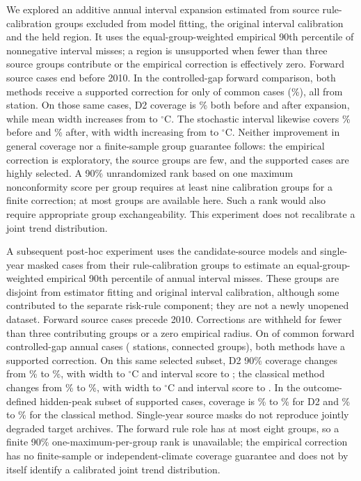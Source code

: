 \documentclass[draft,linenumbers]{agujournal2025}
\begin{document}
We explored an additive annual interval expansion estimated from source rule-calibration groups excluded from model fitting, the original interval calibration and the held region. It uses the equal-group-weighted empirical 90th percentile of nonnegative interval misses; a region is unsupported when fewer than three source groups contribute or the empirical correction is effectively zero. Forward source cases end before 2010. In the controlled-gap forward comparison, both methods receive a supported correction for only \AEFwdSupported{} of \AEFwdCommon{} common cases (\AEFwdPct\%), all from \AEFwdStations{} station. On those same cases, D2 coverage is \AEFwdDTwoBefore\% both before and after expansion, while mean width increases from \AEFwdDTwoWidthBefore{} to \AEFwdDTwoWidthAfter{}$^{\circ}$C. The stochastic interval likewise covers \AEFwdClassicBefore\% before and \AEFwdClassicAfter\% after, with width increasing from \AEFwdClassicWidthBefore{} to \AEFwdClassicWidthAfter{}$^{\circ}$C. Neither improvement in general coverage nor a finite-sample group guarantee follows: the empirical correction is exploratory, the source groups are few, and the supported cases are highly selected. A 90\% unrandomized rank based on one maximum nonconformity score per group requires at least nine calibration groups for a finite correction; at most \AEMaxSourceGroups{} groups are available here. Such a rank would also require appropriate group exchangeability. This experiment does not recalibrate a joint trend distribution.

A subsequent post-hoc experiment uses the candidate-source models and single-year masked cases from their rule-calibration groups to estimate an equal-group-weighted empirical 90th percentile of annual interval misses. These groups are disjoint from estimator fitting and original interval calibration, although some contributed to the separate risk-rule component; they are not a newly unopened dataset. Forward source cases precede 2010. Corrections are withheld for fewer than three contributing groups or a zero empirical radius. On \SYAllSupported{} of \SYAllEligible{} common forward controlled-gap annual cases (\SYAllStations{} stations, \SYAllGroups{} connected groups), both methods have a supported correction. On this same selected subset, D2 90\% coverage changes from \SYDTwoBase\% to \SYDTwoExpanded\%, with width \SYDTwoWidthBase{} to \SYDTwoWidthExpanded{}$^{\circ}$C and interval score \SYDTwoScoreBase{} to \SYDTwoScoreExpanded{}; the classical method changes from \SYClassicBase\% to \SYClassicExpanded\%, with width \SYClassicWidthBase{} to \SYClassicWidthExpanded{}$^{\circ}$C and interval score \SYClassicScoreBase{} to \SYClassicScoreExpanded{}. In the outcome-defined hidden-peak subset of \SYHiddenSupported{} supported cases, coverage is \SYHiddenDTwoBase\% to \SYHiddenDTwoExpanded\% for D2 and \SYHiddenClassicBase\% to \SYHiddenClassicExpanded\% for the classical method. Single-year source masks do not reproduce jointly degraded target archives. The forward rule role has at most eight groups, so a finite 90\% one-maximum-per-group rank is unavailable; the empirical correction has no finite-sample or independent-climate coverage guarantee and does not by itself identify a calibrated joint trend distribution.
\end{document}
